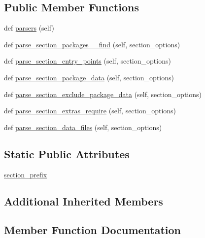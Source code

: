 \subsection*{Public Member Functions}
\begin{DoxyCompactItemize}
\item 
def \hyperlink{classsetuptools_1_1config_1_1ConfigOptionsHandler_a84db64d7a8a64c2816c2967a1ba1a486}{parsers} (self)
\item 
def \hyperlink{classsetuptools_1_1config_1_1ConfigOptionsHandler_afed6ee3f1ec81344d74bdf4628e4c46c}{parse\+\_\+section\+\_\+packages\+\_\+\+\_\+find} (self, section\+\_\+options)
\item 
def \hyperlink{classsetuptools_1_1config_1_1ConfigOptionsHandler_a42f9e236b47d3cb64aceca12f78e2d03}{parse\+\_\+section\+\_\+entry\+\_\+points} (self, section\+\_\+options)
\item 
def \hyperlink{classsetuptools_1_1config_1_1ConfigOptionsHandler_a14aebb7fdf19d03ea94d3d95aa6d7c78}{parse\+\_\+section\+\_\+package\+\_\+data} (self, section\+\_\+options)
\item 
def \hyperlink{classsetuptools_1_1config_1_1ConfigOptionsHandler_ad44f789fc34004eebe3e5550f185c07b}{parse\+\_\+section\+\_\+exclude\+\_\+package\+\_\+data} (self, section\+\_\+options)
\item 
def \hyperlink{classsetuptools_1_1config_1_1ConfigOptionsHandler_adb5582b20141d7b4439ea1e6cab8ddcc}{parse\+\_\+section\+\_\+extras\+\_\+require} (self, section\+\_\+options)
\item 
def \hyperlink{classsetuptools_1_1config_1_1ConfigOptionsHandler_a9437c2f2257d26b698a6263d4d3e6a99}{parse\+\_\+section\+\_\+data\+\_\+files} (self, section\+\_\+options)
\end{DoxyCompactItemize}
\subsection*{Static Public Attributes}
\begin{DoxyCompactItemize}
\item 
\hyperlink{classsetuptools_1_1config_1_1ConfigOptionsHandler_aa0d0e8dc8dd85ccce427a87a558f322e}{section\+\_\+prefix}
\end{DoxyCompactItemize}
\subsection*{Additional Inherited Members}


\subsection{Member Function Documentation}
\mbox{\label{classsetuptools_1_1config_1_1ConfigOptionsHandler_a9437c2f2257d26b698a6263d4d3e6a99}} 
